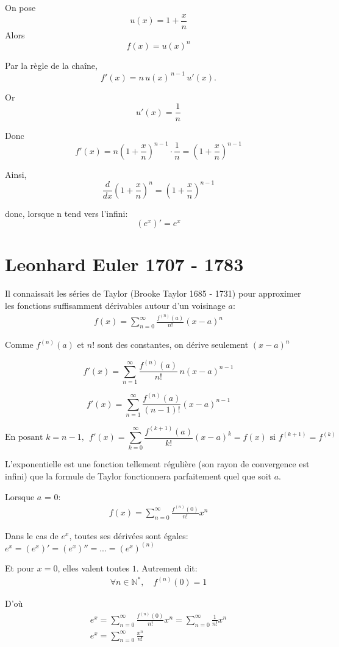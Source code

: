 \documentclass[12pt]{article}
\begin{document}
On pose
\[
u(x)=1+\frac{x}{n}
\]
Alors
\[
f(x)=u(x)^n
\]

Par la règle de la chaîne,
\[
f'(x)=n\,u(x)^{\,n-1}\,u'(x).
\]

Or
\[
u'(x)=\frac{1}{n}
\]

Donc
\[
f'(x)=n\left(1+\frac{x}{n}\right)^{n-1}\cdot\frac{1}{n}
=\left(1+\frac{x}{n}\right)^{n-1}
\]

Ainsi,
\[
\boxed{
\frac{d}{dx}\left(1+\frac{x}{n}\right)^n
=\left(1+\frac{x}{n}\right)^{n-1}
}
\]

donc, lorsque n tend vers l'infini:
\[
    (e^x)'=e^x
\]


\section{Leonhard Euler 1707 - 1783}
Il connaissait les séries de Taylor (Brooke Taylor 1685 - 1731) pour approximer les fonctions suffisamment dérivables autour d'un voisinage $a$:
\begin{gather*}
    f(x)=\sum_{n=0}^{\infty}\frac{f^{(n)}(a)}{n!}(x-a)^n
\end{gather*}

Comme $f^{(n)}(a)$ et $n!$ sont des constantes, on dérive seulement $(x-a)^n$

\[
f'(x)
=\sum_{n=1}^{\infty}\frac{f^{(n)}(a)}{n!}\,n(x-a)^{n-1}
\]

\[
f'(x)=\sum_{n=1}^{\infty}\frac{f^{(n)}(a)}{(n-1)!}(x-a)^{n-1}
\]

\[
\text{En posant } k=n-1,\ \ f'(x)=\sum_{k=0}^{\infty}\frac{f^{(k+1)}(a)}{k!}(x-a)^k = f(x) \text{ si } f^{(k+1)} = f^{(k)}
\]


L'exponentielle est une fonction tellement régulière (son rayon de convergence est infini) que la formule de Taylor fonctionnera parfaitement quel que soit $a$.

Lorsque $a$ = 0:
\begin{gather*}
    f(x)=\sum_{n=0}^{\infty}\frac{f^{(n)}(0)}{n!}x^n
\end{gather*}

Dans le cas de $e^x$, toutes ses dérivées sont égales: $e^x=(e^x)'=(e^x)''=...=(e^x)^{(n)}$

Et pour $x=0$, elles valent toutes $1$. Autrement dit:
\begin{gather*}
    \forall n \in \mathbb{N^*}, \quad f^{(n)}(0)=1
\end{gather*}

D'où
\begin{gather*}
    e^x=\sum_{n=0}^{\infty}\frac{f^{(n)}(0)}{n!}x^n=\sum_{n=0}^{\infty}\frac{1}{n!}x^n \\
    \boxed{e^x=\sum_{n=0}^\infty{\frac{x^n}{n!}}}
\end{gather*}
\end{document}
